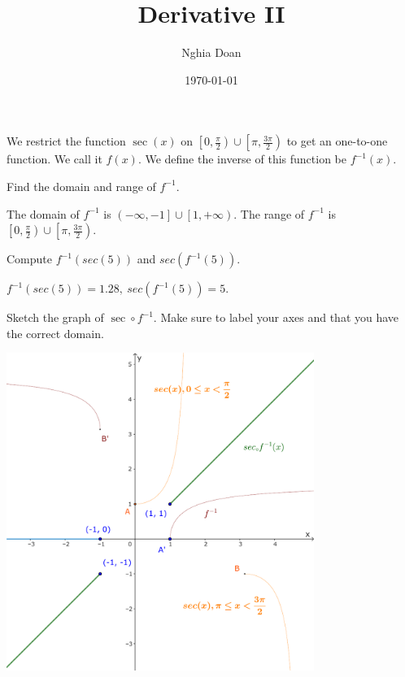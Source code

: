 \documentclass{article}
\title{Derivative II}
\author{Nghia Doan}
\date{\today}
\begin{document}
\maketitle

\begin{problem*}[1a]
    We restrict the function $\sec(x)$ on $\left[ 0, \frac{\pi}{2} \right) \cup \left[ \pi, \frac{3\pi}{2} \right)$ to get an one-to-one function.
    We call it $f(x).$ We define the inverse of this function be $f^{-1}(x).$

    Find the domain and range of $f^{-1}.$
\end{problem*}

\begin{soln}
    The domain of $f^{-1}$ is $\left( -\infty, -1 \right] \cup \left[ 1, +\infty \right).$
    The range of $f^{-1}$ is $\left[ 0, \frac{\pi}{2} \right) \cup \left[ \pi, \frac{3\pi}{2} \right).$
\end{soln}

\begin{problem*}[1b]
    Compute $f^{-1}(sec(5))$ and $sec(f^{-1}(5)).$
\end{problem*}

\begin{soln}
    $f^{-1}(sec(5)) = 1.28,\ sec(f^{-1}(5)) = 5.$
\end{soln}

\begin{problem*}[1c]
    Sketch the graph of $\sec \circ f^{-1}.$ Make sure to label your axes and that you have the correct domain.
\end{problem*}

\begin{center}
    \includegraphics[width=10cm]{./svg/pdf/derivative-2-1c-f.pdf}
\end{center}
\end{document}
